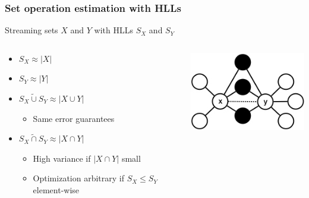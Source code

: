 \documentclass{beamer}
\newcommand{\algoname}[1]{\textnormal{\textsc{#1}}}
\begin{document}
\begin{frame}
\frametitle{Set operation estimation with \algoname{HLL}s}

Streaming sets $X$ and $Y$ with \algoname{HLL}s $S_X$ and $S_Y$
\begin{columns}
\begin{column}{0.5\textwidth}
	\begin{itemize}
		\item $S_X \approx |X|$
		\item $S_Y \approx |Y|$
		\item $S_X \widetilde{\cup} S_Y \approx |X \cup Y|$
		\begin{itemize}
			\item Same error guarantees
		\end{itemize}
		\item $S_X \widetilde{\cap} S_Y \approx |X \cap Y|$
		\begin{itemize}
			\item High variance if $|X \cap Y|$ small
			\item Optimization arbitrary if $S_X \leq S_Y$ element-wise
		\end{itemize}
	\end{itemize}
\end{column}
\begin{column}{0.5\textwidth}  %
	\begin{center}
		\includegraphics[width=1.0\textwidth]{edge_local}
	\end{center}
\end{column}

\end{columns}


\end{frame}
\end{document}
